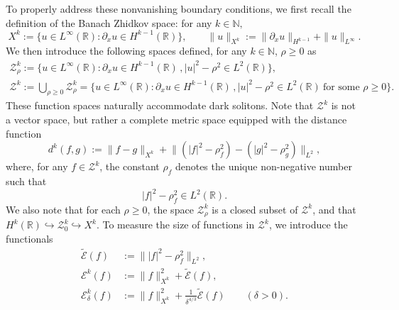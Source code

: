 \documentclass{amsart}
\numberwithin{equation}{section}
\newcommand{\R}{\mathbb{R}}
\newcommand{\N}{\mathbb{N}}
\begin{document}
To properly address these nonvanishing boundary conditions, we first recall the definition of the Banach Zhidkov space: for any $k\in \N,$
\[ X^k:=\{ u\in L^\infty(\R):\partial_xu\in H^{k-1}(\R)\},\qquad \| u\|_{X^k}:=\| \partial_xu\|_{H^{k-1}}+\| u\|_{L^\infty}. \]
We then introduce the following spaces defined, for any $k\in \N$, $\rho\geq 0$ as
\begin{equation}\label{X}
\begin{gathered}
\mathcal{Z}^k_\rho:=\{ u\in L^{\infty}(\R) : \partial_xu\in H^{k-1}(\R)\,,|u|^2-\rho^2 \in L^2(\R) \}, \\
\mathcal{Z}^k:=\bigcup_{\rho\geq 0}\mathcal{Z}^k_\rho =\{ u\in L^\infty(\R) : \partial_xu\in H^{k-1}(\R)\,,|u|^2-\rho^2\in L^2(\R)~\text{for some $\rho\geq 0$}\} .
\end{gathered}
\end{equation}
These function spaces naturally accommodate dark solitons. 
Note that $\mathcal{Z}^k$ is not a vector space, but rather a complete metric space equipped with the distance function
\begin{equation}\label{def:dk}
d^k(f,g):=\| f-g\|_{X^k}+\big\| (|f|^2-\rho_f^2)-(|g|^2-\rho_g^2)\big\|_{L^2},
\end{equation}
where, for any $f\in \mathcal{Z}^k$, the constant $\rho_f$ denotes the unique non-negative number such that 
\[ |f|^2-\rho_f^2\in L^2(\R). \]
We also note that for each $\rho\geq 0$, the space $\mathcal{Z}^k_\rho$ is a closed subset of $\mathcal{Z}^k$, and that $H^k(\R) \hookrightarrow \mathcal{Z}^k_0 \hookrightarrow X^k$.
To measure the size of functions in $\mathcal{Z}^k$, we introduce the functionals
\begin{equation}\label{def:Ek}
\begin{aligned} 
\widetilde{\mathcal{E}} (f) &:=\big\| |f|^2-\rho_f^2 \big\|_{L^2} , \\ 
\mathcal{E}^k(f)&:= \| f\|_{X^k}^2+\widetilde{\mathcal{E}} (f), \\
\mathcal{E}^k_\delta (f) &:=\| f \|_{X^k}^2 + \tfrac{1}{\delta^{4/3}} \widetilde{\mathcal{E}}(f) \qquad (\delta>0).
\end{aligned} 
\end{equation}
\end{document}
